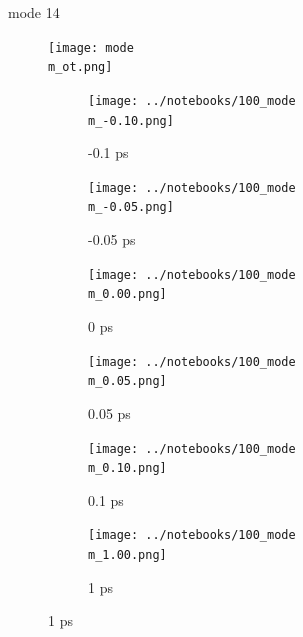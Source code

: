 \documentclass{beamer}
\newcommand\w{0.32}
\begin{document}
\renewcommand\m{14}
\begin{frame}{mode \m}
		\vspace{\vh mm}
	\begin{figure}
		\centering
		\texttt{[image: mode\\m\_ot.png]}
	\end{figure}
	\begin{figure}
		\centering
		\begin{subfigure}[b]{\w\textwidth}
			\centering
			\texttt{[image: ../notebooks/100\_mode\\m\_-0.10.png]}
			\caption{-0.1 ps}
		\end{subfigure}
		\begin{subfigure}[b]{\w\textwidth}
			\centering
			\texttt{[image: ../notebooks/100\_mode\\m\_-0.05.png]}
			\caption{-0.05 ps}
		\end{subfigure}
		\begin{subfigure}[b]{\w\textwidth}
			\centering
			\texttt{[image: ../notebooks/100\_mode\\m\_0.00.png]}
			\caption{0 ps}
		\end{subfigure}
		\begin{subfigure}[b]{\w\textwidth}
			\centering
			\texttt{[image: ../notebooks/100\_mode\\m\_0.05.png]}
			\caption{0.05 ps}
		\end{subfigure}
		\begin{subfigure}[b]{\w\textwidth}
			\centering
			\texttt{[image: ../notebooks/100\_mode\\m\_0.10.png]}
			\caption{0.1 ps}
		\end{subfigure}
		\begin{subfigure}[b]{\w\textwidth}
			\centering
			\texttt{[image: ../notebooks/100\_mode\\m\_1.00.png]}
			\caption{1 ps}
		\end{subfigure}
	\end{figure}
\end{frame}
\end{document}
